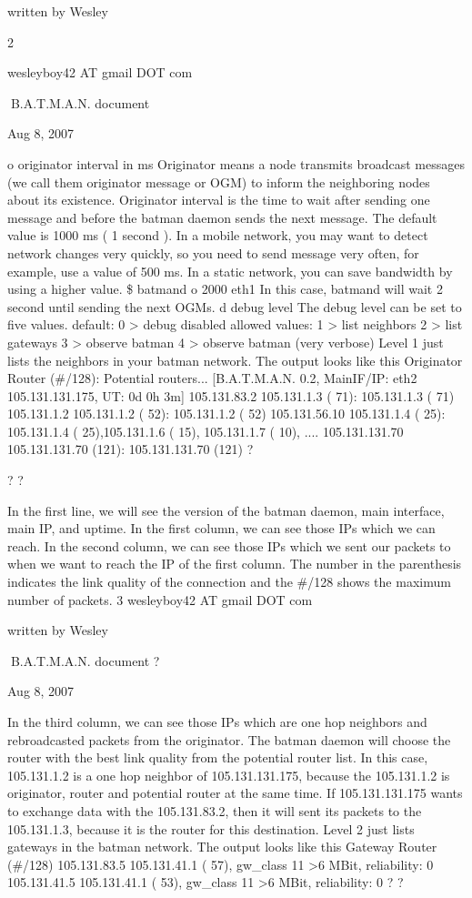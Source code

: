 \documentclass[
	12pt,
	a4paper,
	twoside,
	english,
	headsepline,
	footnosepline,
	automark,
	normalheadings,
	openany,
	cleardoubleplain,
	abstracton,
	idxtotoc,
	liststotoc,
	bibtotoc,
 	BCOR8mm,
]{scrartcl}
\begin{document}
written by Wesley

2

wesleyboy42 AT gmail DOT com

B.A.T.M.A.N. document

Aug 8, 2007

 o originator interval in ms Originator means a node transmits broadcast messages (we call them originator message or  OGM) to inform the neighboring nodes about its existence. Originator interval is the time to wait after sending one message and before the batman  daemon sends the next message. The default value is 1000 ms ( 1 second ). In a mobile network, you may want to detect network changes very quickly, so you need to  send message very often, for example, use a value of 500 ms. In a static network, you can save bandwidth by using a higher value. \$ batmand  o 2000 eth1 In this case, batmand will wait 2 second until sending the next OGMs.  d debug level The debug level can be set to five values.           default:   0  > debug disabled           allowed values:   1  > list neighbors                               2  > list gateways                               3  > observe batman                               4  > observe batman (very verbose) Level 1 just lists the neighbors in your batman network. The output looks like this Originator           Router (\#/128):    Potential routers... [B.A.T.M.A.N. 0.2, MainIF/IP:   eth2 105.131.131.175, UT: 0d 0h 3m] 105.131.83.2        105.131.1.3 (  71):     105.131.1.3 (  71) 105.131.1.2         105.131.1.2 (  52):     105.131.1.2 (  52) 105.131.56.10     105.131.1.4 (  25):   105.131.1.4 (  25),105.131.1.6 ( 15), 105.131.1.7 ( 10),   .... 105.131.131.70   105.131.131.70 (121):  105.131.131.70 (121)
?

? ?

In the first line, we will see the version of the batman daemon, main interface, main  IP, and uptime. In the first column, we can see those IPs  which we can reach. In the second column, we can see those IPs which we sent our packets to when we  want to reach the IP of the first column. The number in the parenthesis indicates the  link quality of the connection and the \#/128 shows the maximum number of packets. 3 wesleyboy42 AT gmail DOT com

written by Wesley

B.A.T.M.A.N. document
?

Aug 8, 2007

In the third column, we can see those IPs which are one hop neighbors and  rebroadcasted packets from the originator. The batman daemon will choose the router  with the best link quality from the potential router list.  In this case, 105.131.1.2 is a one hop neighbor of 105.131.131.175, because the 105.131.1.2  is  originator, router and potential router at the same time. If 105.131.131.175 wants to exchange  data with the 105.131.83.2, then it will sent its packets to the 105.131.1.3, because it is the  router for this destination. Level 2 just lists gateways in the batman network. The output looks like this Gateway              Router (\#/128)   105.131.83.5       105.131.41.1 ( 57), gw\_class 11   >6 MBit, reliability: 0   105.131.41.5       105.131.41.1 ( 53), gw\_class 11   >6 MBit, reliability: 0
? ?
\end{document}
